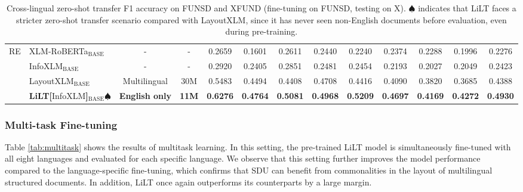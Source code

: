 \documentclass[11pt]{article}
\begin{document}
\begin{table*}[!]
{\begin{tabular}{@{}clccccccccccc@{}}
\multirow{4}{*}{RE}  & XLM-RoBERTa$_{\mathrm{BASE}}$        &     -     &  -             &  0.2659 &0.1601& 0.2611 &0.2440 &0.2240 &0.2374 &0.2288 &0.1996& 0.2276 \\
& InfoXLM$_{\mathrm{BASE}}$            &     -    &   -            &  0.2920& 0.2405 &0.2851 &0.2481 &0.2454& 0.2193 &0.2027 &0.2049 &0.2423  \\
& LayoutXLM$_{\mathrm{BASE}}$         &    Multilingual     &    30M           &  0.5483& 0.4494& 0.4408 &0.4708 &0.4416 &0.4090 &0.3820& 0.3685 &0.4388  \\
\cmidrule(l){2-13} 
& \textbf{LiLT[}InfoXLM\textbf{]}$_{\mathrm{BASE}}\spadesuit$             &     \textbf{English only}    &   \textbf{11M}           &    \textbf{0.6276}                   &     \textbf{0.4764}               &    \textbf{0.5081}                 &     \textbf{0.4968}            & \textbf{0.5209}               &   \textbf{0.4697}             &   \textbf{0.4169  }              &  \textbf{0.4272 }         &  \textbf{0.4930 }  \\ \bottomrule 
\end{tabular}}
\caption{Cross-lingual zero-shot transfer F1 accuracy  on FUNSD and XFUND (fine-tuning on FUNSD, testing on X). 
$\spadesuit$ indicates that LiLT faces a  stricter zero-shot transfer scenario compared with LayoutXLM, since it has never seen non-English documents before evaluation, even during pre-training.}
\label{tab:zero-shot}
\end{table*}
\subsubsection{Multi-task Fine-tuning}

Table \ref{tab:multitask} shows  the results of multitask learning. In this setting, the pre-trained LiLT model is simultaneously fine-tuned with all eight languages  and evaluated for each specific language.
We observe that this setting further improves the model performance compared to the language-specific fine-tuning, which confirms that SDU  can benefit from commonalities in the layout  of multilingual structured documents.
In addition, LiLT once again outperforms its counterparts by a large margin.
\end{document}

